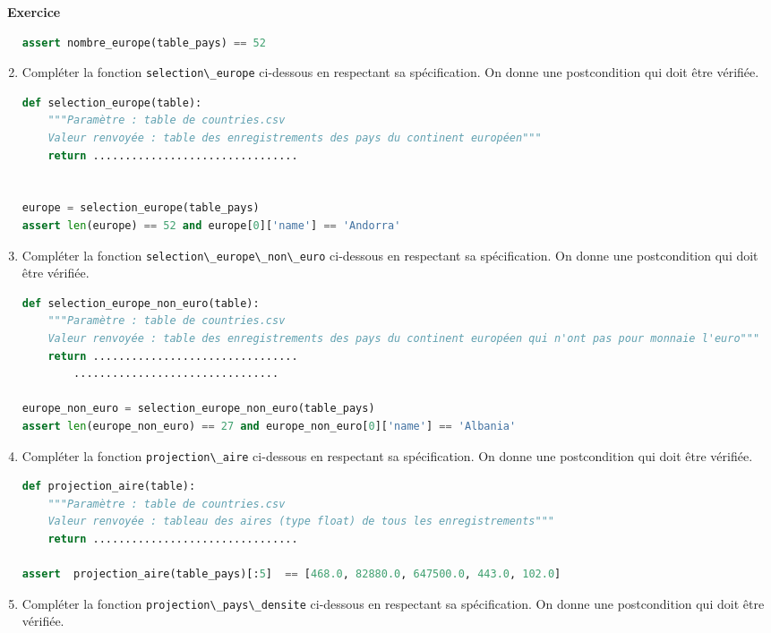 \documentclass[
  11pt,
]{article}
\newcommand{\passthrough}[1]{#1}
\newcounter{exo}
\newenvironment{exercice}[1]
{\par \medskip   \addtocounter{exo}{1} \noindent  
\begin{bclogo}[arrondi =0.1,   noborder = true, logo=\bccrayon, marge=4]{~\textbf{Exercice} \textbf{\theexo} {\itshape #1} }  \par}
{
\end{bclogo}
 \par \bigskip }
\newcounter{def}
\begin{document}
\begin{exercice}{}
\begin{enumerate}
\begin{lstlisting}[language=Python]
assert nombre_europe(table_pays) == 52
\end{lstlisting}
\item
  Compléter la fonction \passthrough{\lstinline!selection\_europe!}
  ci-dessous en respectant sa spécification. On donne une postcondition
  qui doit être vérifiée.

\begin{lstlisting}[language=Python]
def selection_europe(table):
    """Paramètre : table de countries.csv
    Valeur renvoyée : table des enregistrements des pays du continent européen"""
    return ................................


europe = selection_europe(table_pays)
assert len(europe) == 52 and europe[0]['name'] == 'Andorra'
\end{lstlisting}
\item
  Compléter la fonction
  \passthrough{\lstinline!selection\_europe\_non\_euro!} ci-dessous en
  respectant sa spécification. On donne une postcondition qui doit être
  vérifiée.

\begin{lstlisting}[language=Python]
def selection_europe_non_euro(table):
    """Paramètre : table de countries.csv
    Valeur renvoyée : table des enregistrements des pays du continent européen qui n'ont pas pour monnaie l'euro"""
    return ................................
        ................................

europe_non_euro = selection_europe_non_euro(table_pays)
assert len(europe_non_euro) == 27 and europe_non_euro[0]['name'] == 'Albania'
\end{lstlisting}
\item
  Compléter la fonction \passthrough{\lstinline!projection\_aire!}
  ci-dessous en respectant sa spécification. On donne une postcondition
  qui doit être vérifiée.

\begin{lstlisting}[language=Python]
def projection_aire(table):
    """Paramètre : table de countries.csv
    Valeur renvoyée : tableau des aires (type float) de tous les enregistrements"""
    return ................................

assert  projection_aire(table_pays)[:5]  == [468.0, 82880.0, 647500.0, 443.0, 102.0]
\end{lstlisting}
\item
  Compléter la fonction
  \passthrough{\lstinline!projection\_pays\_densite!} ci-dessous en
  respectant sa spécification. On donne une postcondition qui doit être
  vérifiée.


\end{enumerate}
\end{exercice}
\end{document}
